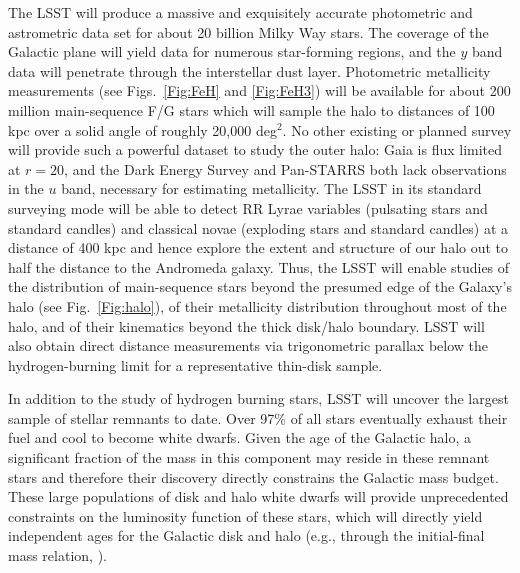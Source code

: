 The LSST will produce a massive and exquisitely accurate photometric and astrometric data set for about 20 billion
Milky Way stars. The coverage of the Galactic plane will yield data for numerous star-forming
regions, and the $y$ band data will penetrate through the interstellar dust layer. Photometric metallicity
measurements (see Figs.~\ref{Fig:FeH} and \ref{Fig:FeH3}) will be available for about 200 million main-sequence
F/G stars which will sample the halo to distances of 100 kpc
\citep{2008ApJ...684..287I,2013ApJ...763...65A} over a solid angle of
roughly 20,000 deg$^2$. No other
existing or planned survey will provide such a powerful dataset to
study the outer halo: Gaia
is flux limited at $r=20$, and the Dark Energy Survey \citep{2011AJ....141..185R} and Pan-STARRS both
lack observations in the $u$ band, necessary for estimating metallicity. The LSST in its standard surveying mode will
be able to detect RR Lyrae variables (pulsating stars and standard candles) and classical novae (exploding stars
and standard candles) at a distance of 400 kpc and hence explore the extent and structure of our  halo out to
half the distance to the Andromeda galaxy. Thus, the LSST will enable studies of the distribution of main-sequence
stars beyond the presumed edge of the Galaxy's halo (see Fig.~\ref{Fig:halo}), of their metallicity distribution
throughout most of the halo, and of their kinematics beyond the thick disk/halo boundary. LSST will also obtain
direct distance measurements via trigonometric parallax below the hydrogen-burning limit for a representative
thin-disk sample.


In addition to the study of hydrogen burning stars, LSST will uncover the largest sample of stellar remnants to date.
Over 97\% of all stars eventually exhaust their fuel and cool to become white dwarfs. Given the age of the Galactic
halo, a significant fraction of the mass in this component may reside in these remnant stars
\citep[e.g.,][]{2000ApJ...542..281A,2007A&A...469..387T}
and therefore their discovery directly constrains the Galactic mass budget.  These large
populations of disk and halo white dwarfs will provide unprecedented constraints on the luminosity function of
these stars, which will directly yield independent ages for the Galactic disk and halo (e.g., through the initial-final mass
relation, \citet{2008ApJ...676..594K}).

